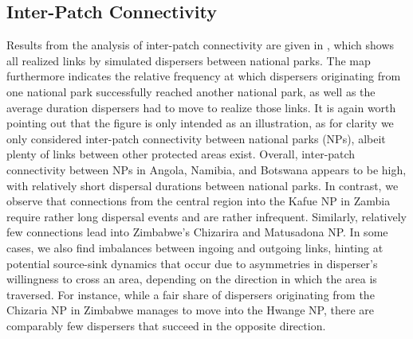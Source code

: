 \documentclass[abstract=on,10pt,a4paper,bibliography=totocnumbered]{article}
\begin{document}
\subsection{Inter-Patch Connectivity}
Results from the analysis of inter-patch connectivity are given in
, which shows all realized links by simulated dispersers
between national parks. The map furthermore indicates the relative frequency at
which dispersers originating from one national park successfully reached another
national park, as well as the average duration dispersers had to move to realize
those links. It is again worth pointing out that the figure is only intended as
an illustration, as for clarity we only considered inter-patch connectivity
between national parks (NPs), albeit plenty of links between other protected
areas exist. Overall, inter-patch connectivity between NPs in Angola, Namibia,
and Botswana appears to be high, with relatively short dispersal durations
between national parks. In contrast, we observe that connections from the
central region into the Kafue NP in Zambia require rather long dispersal events
and are rather infrequent. Similarly, relatively few connections lead into
Zimbabwe's Chizarira and Matusadona NP. In some cases, we also find imbalances
between ingoing and outgoing links, hinting at potential source-sink dynamics
that occur due to asymmetries in disperser's willingness to cross an area,
depending on the direction in which the area is traversed. For instance, while a
fair share of dispersers originating from the Chizaria NP in Zimbabwe manages to
move into the Hwange NP, there are comparably few dispersers that succeed in the
opposite direction.

\end{document}
